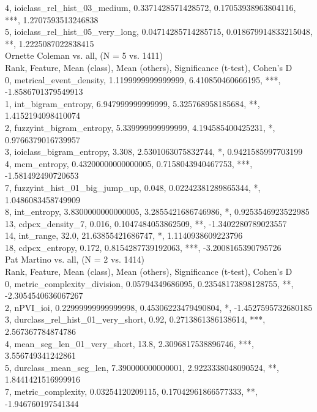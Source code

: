 4, ioiclass_rel_hist_03_medium, 0.3371428571428572, 0.17053938963804116, ***, 1.2707593513246838\\
5, ioiclass_rel_hist_05_very_long, 0.04714285714285715, 0.018679914833215048, **, 1.2225087022838415\\
Ornette Coleman vs. all, (N = 5 vs. 1411)\\
Rank, Feature, Mean (class), Mean (others), Significance (t-test), Cohen's D\\
0, metrical_event_density, 1.1199999999999999, 6.410850460666195, ***, -1.8586701379549913\\
1, int_bigram_entropy, 6.947999999999999, 5.325768958185684, **, 1.4152194098410074\\
2, fuzzyint_bigram_entropy, 5.339999999999999, 4.194585400425231, *, 0.9766379016739957\\
3, ioiclass_bigram_entropy, 3.308, 2.5301063075832744, *, 0.9421585997703199\\
4, mcm_entropy, 0.43200000000000005, 0.7158043940467753, ***, -1.581492490720653\\
7, fuzzyint_hist_01_big_jump_up, 0.048, 0.02242381289865344, *, 1.0486083458749909\\
8, int_entropy, 3.8300000000000005, 3.2855421686746986, *, 0.9253546923522985\\
13, cdpcx_density_7, 0.016, 0.1047484053862509, **, -1.3402280789023557\\
14, int_range, 32.0, 21.63855421686747, *, 1.1140938609223796\\
18, cdpcx_entropy, 0.172, 0.8154287739192063, ***, -3.2008165390795726\\
Pat Martino vs. all, (N = 2 vs. 1414)\\
Rank, Feature, Mean (class), Mean (others), Significance (t-test), Cohen's D\\
0, metric_complexity_division, 0.05794349686095, 0.23548173898128755, **, -2.3054540636067267\\
2, nPVI_ioi, 0.22999999999999998, 0.45306223479490804, *, -1.4527595732680185\\
3, durclass_rel_hist_01_very_short, 0.92, 0.2713861386138614, ***, 2.567367784874786\\
4, mean_seg_len_01_very_short, 13.8, 2.3096817538896746, ***, 3.556749341242861\\
5, durclass_mean_seg_len, 7.390000000000001, 2.9223338048090524, **, 1.8441421516999916\\
7, metric_complexity, 0.03254120209115, 0.17042961866577333, **, -1.946760197541344\\
